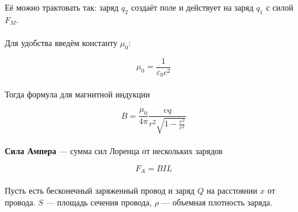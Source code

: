 \documentclass[dvipdfmx]{article}
\begin{document}
Её можно трактовать так: заряд $q_2$ создаёт поле и действует на заряд $q_1$ с силой $F_M$.

\paragraph{}

Для удобства введём константу $\mu_0$:

\begin{equation*}
  \mu_0 = \frac{1}{\varepsilon_0c^2}
\end{equation*}
\paragraph{}

Тогда формула для магнитной индукции

\begin{equation*}
  B = \frac{\mu_0}{4\pi}\frac{\upsilon q}{r^2\sqrt{1-\frac{\upsilon^2}{c^2}}}
\end{equation*}
\paragraph{}

\textbf{Сила Ампера} --- сумма сил Лоренца от нескольких зарядов

\begin{equation*}
  F_A = BIL
\end{equation*}

\newpage

\paragraph{}
Пусть есть бесконечный заряженный провод и заряд $Q$ на расстоянии $x$ от провода. $S$ --- площадь
сечения провода, $\rho$ --- объемная плотность заряда.
\paragraph{}
\noindent{}
\end{document}
